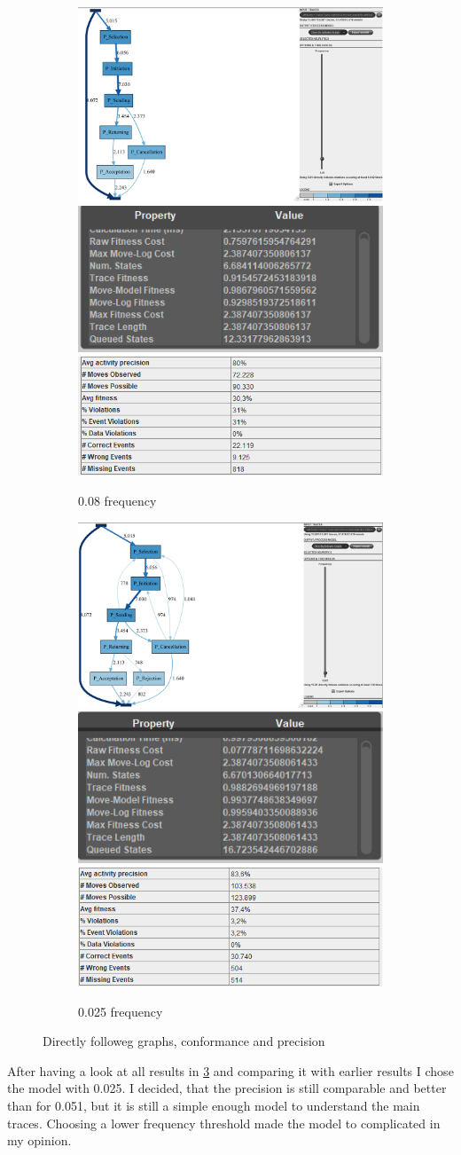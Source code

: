 \begin{figure}[!htbp]
\centering
\begin{subfigure}{0.8\textwidth}
  \centering
  \includegraphics[width=0.3\linewidth]{P_DirectlyFollowedFreq0-08.PNG}
  \includegraphics[width=0.3\linewidth]{P_Conformance0-08.PNG}
  \includegraphics[width=0.3\linewidth]{P_Precision0-08.PNG}
  \caption{0.08 frequency}
  \label{fig:P_0-08}
\end{subfigure}
\begin{subfigure}{0.8\textwidth}
  \centering
  \includegraphics[width=0.3\linewidth]{P_DirectlyFollowedFreq0-025.PNG}
  \includegraphics[width=0.3\linewidth]{P_Conformance0-025.PNG}
  \includegraphics[width=0.3\linewidth]{P_Precision0-025.PNG}
  \caption{0.025 frequency}
  \label{fig:P_0-025}
\end{subfigure}
\caption{Directly followeg graphs, conformance and precision}
\label{fig:P_Direct2}
\end{figure}

After having a look at all results in \ref{fig:P_Direct2} and comparing it with earlier results I chose the model with 0.025. I decided, that the precision is still comparable and better than for 0.051, but it is still a simple enough model to understand the main traces. Choosing a lower frequency threshold made the model to complicated in my opinion.

